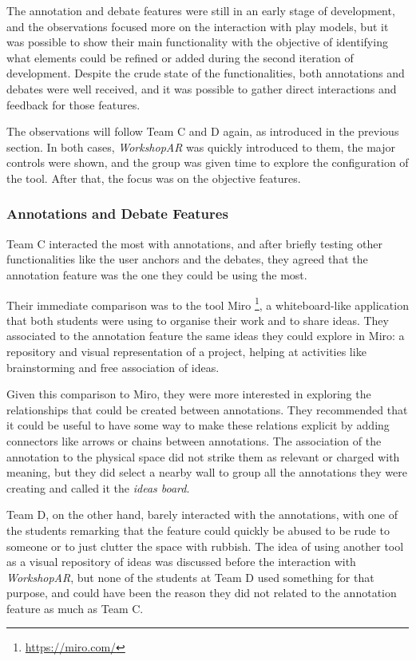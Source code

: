 The annotation and debate features were still in an early stage of development, and the observations focused more on the interaction with play models, but it was possible
to show their main functionality with the objective of identifying what elements could be refined or added during the second iteration of development. Despite the crude
state of the functionalities, both annotations and debates were well received, and it was possible to gather direct interactions and feedback for those features.

The observations will follow Team C and D again, as introduced in the previous section. In both cases, \emph{WorkshopAR} was quickly introduced to them, the major controls were
shown, and the group was given time to explore the configuration of the tool. After that, the focus was on the objective features.

\subsubsection{Annotations and Debate Features \label{sec:6-5-2-1}}

Team C interacted the most with annotations, and after briefly testing other functionalities like the user anchors and the debates, they agreed that the annotation feature
was the one they could be using the most.

Their immediate comparison was to the tool Miro \footnote{\url{https://miro.com/}}, a whiteboard-like application that both students were using to organise their work and
to share ideas. They associated to the annotation feature the same ideas they could explore in Miro: a repository and visual representation of a project, helping at
activities like brainstorming and free association of ideas.

Given this comparison to Miro, they were more interested in exploring the relationships that could be created between annotations. They recommended that it could be useful
to have some way to make these relations explicit by adding connectors like arrows or chains between annotations. The association of the annotation to the physical space
did not strike them as relevant or charged with meaning, but they did select a nearby wall to group all the annotations they were creating and called it the \emph{ideas board}.

Team D, on the other hand, barely interacted with the annotations, with one of the students remarking that the feature could quickly be abused to be rude to someone or to
just clutter the space with rubbish. The idea of using another tool as a visual repository of ideas was discussed before the interaction with \emph{WorkshopAR}, but none of the
students at Team D used something for that purpose, and could have been the reason they did not related to the annotation feature as much as Team C.

